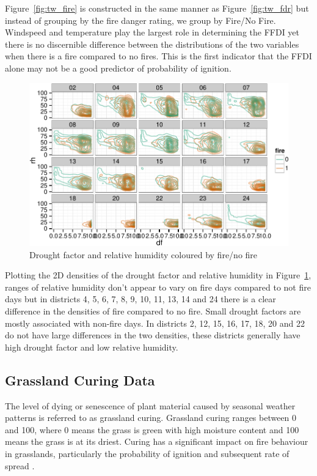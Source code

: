 \documentclass[11pt,a4paper]{article}
\begin{document}
Figure~\ref{fig:tw_fire} is constructed in the same manner as Figure~\ref{fig:tw_fdr} but instead of grouping by the fire danger rating, we group by Fire/No Fire. Windspeed and temperature play the largest role in determining the FFDI yet there is no discernible difference between the distributions of the two variables when there is a fire compared to no fires. This is the first indicator that the FFDI alone may not be a good predictor of probability of ignition.

\begin{figure}
  \centering
  \includegraphics[width=\textwidth]{figures/dh_fire.pdf}
  \caption{Drought factor and relative humidity coloured by fire/no fire}
  \label{fig:dh_fire}
\end{figure}

Plotting the 2D densities of the drought factor and relative humidity in Figure~\ref{fig:dh_fire}, ranges of relative humidity don't appear to vary on fire days compared to not fire days but in districts 4, 5, 6, 7, 8, 9, 10, 11, 13, 14 and 24 there is a clear difference in the densities of fire compared to no fire. Small drought factors are mostly associated with non-fire days. In districts 2, 12, 15, 16, 17, 18, 20 and 22 do not have large differences in the two densities, these districts generally have high drought factor and low relative humidity.


\subsection{Grassland Curing Data}

The level of dying or senescence of plant material caused by seasonal weather patterns is referred to as grassland curing. Grassland curing ranges between 0 and 100, where 0 means the grass is green with high moisture content and 100 means the grass is at its driest. Curing has a significant impact on fire behaviour in grasslands, particularly the probability of ignition and subsequent rate of spread \citep{cheney08}.
\end{document}

